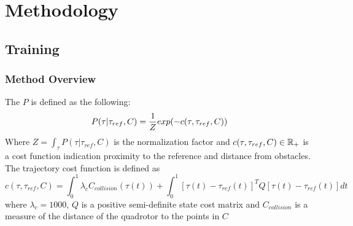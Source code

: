 \chapter{Methodology}
\lipsum[1-2]


\section{Training}
\lipsum[1]

\subsection{Method Overview}
\lipsum[1-2]

The $P$ is defined as the following:
\begin{equation}
	P(\tau | \tau_{ref},C) = \frac{1}{Z} exp(-c(\tau, \tau_{ref},C)) \\
\end{equation}
Where $	Z = \int_{\tau} P(\tau | \tau_{ref},C)$ is the normalization factor and $c(\tau, \tau_{ref},C) \in \mathbb{R}_+$ is a cost function indication proximity to the reference and distance from obstacles. The trajectory cost function is defined as 
\begin{equation}
	c(\tau, \tau_{ref},C) = \int_0^1 \lambda_c C_{collision}(\tau(t)) + \int_0^1 [\tau(t)-\tau_{ref}(t)]^T Q[\tau(t)-\tau_{ref}(t)]{dt}
	\label{eqn:collision}
\end{equation}
where $\lambda_c = 1000$, $Q$ is a positive semi-definite state cost matrix and $C_{collision}$ is a measure of the distance of the quadrotor to the points in $C$ 

\lipsum[1-2]